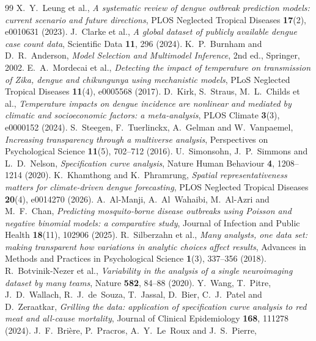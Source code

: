\documentclass[11pt,a4paper]{article}
\begin{document}
\begin{thebibliography}{99}
 X.~Y.~Leung et al., \emph{A systematic review of dengue
outbreak prediction models: current scenario and future directions}, PLOS
Neglected Tropical Diseases \textbf{17}(2), e0010631 (2023).
 J.~Clarke et al., \emph{A global dataset of publicly
available dengue case count data}, Scientific Data \textbf{11}, 296 (2024).
 K.~P.~Burnham and D.~R.~Anderson, \emph{Model Selection and
Multimodel Inference}, 2nd ed., Springer, 2002.
 E.~A.~Mordecai et al., \emph{Detecting the impact of
temperature on transmission of Zika, dengue and chikungunya using mechanistic
models}, PLoS Neglected Tropical Diseases \textbf{11}(4), e0005568 (2017).
 D.~Kirk, S.~Straus, M.~L.~Childs et al., \emph{Temperature
impacts on dengue incidence are nonlinear and mediated by climatic and
socioeconomic factors: a meta-analysis}, PLOS Climate \textbf{3}(3), e0000152
(2024).
 S.~Steegen, F.~Tuerlinckx, A.~Gelman and W.~Vanpaemel,
\emph{Increasing transparency through a multiverse analysis}, Perspectives on
Psychological Science \textbf{11}(5), 702--712 (2016).
 U.~Simonsohn, J.~P.~Simmons and L.~D.~Nelson,
\emph{Specification curve analysis}, Nature Human Behaviour \textbf{4},
1208--1214 (2020).
 K.~Khamthong and K.~Phramrung, \emph{Spatial
representativeness matters for climate-driven dengue forecasting}, PLOS Neglected
Tropical Diseases \textbf{20}(4), e0014270 (2026).
 A.~Al-Manji, A.~Al~Wahaibi, M.~Al-Azri and M.~F.~Chan,
\emph{Predicting mosquito-borne disease outbreaks using Poisson and negative
binomial models: a comparative study}, Journal of Infection and Public Health
\textbf{18}(11), 102906 (2025).
 R.~Silberzahn et al., \emph{Many analysts, one data set:
making transparent how variations in analytic choices affect results}, Advances
in Methods and Practices in Psychological Science \textbf{1}(3), 337--356 (2018).
 R.~Botvinik-Nezer et al., \emph{Variability in the analysis of a
single neuroimaging dataset by many teams}, Nature \textbf{582}, 84--88 (2020).
 Y.~Wang, T.~Pitre, J.~D.~Wallach, R.~J.~de~Souza,
T.~Jassal, D.~Bier, C.~J.~Patel and D.~Zeraatkar, \emph{Grilling the data:
application of specification curve analysis to red meat and all-cause
mortality}, Journal of Clinical Epidemiology \textbf{168}, 111278 (2024).
 J.~F.~Brière, P.~Pracros, A.~Y.~Le~Roux and J.~S.~Pierre,

\end{thebibliography}
\end{document}
